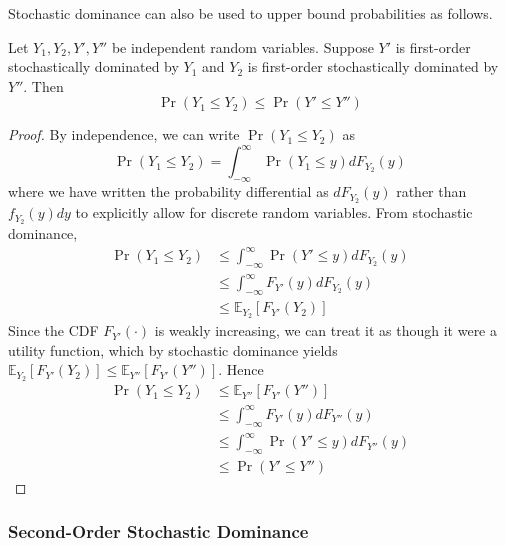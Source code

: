 \documentclass[11pt]{report} %
\begin{document}
Stochastic dominance can also be used to upper bound probabilities as follows.
\begin{corollary}
Let $Y_{1}, Y_{2}, Y', Y''$ be independent random variables. Suppose $Y'$ is first-order stochastically dominated by $Y_{1}$ and $Y_{2}$ is first-order stochastically dominated by $Y''$. Then
\begin{equation}
\operatorname{Pr}\left(Y_{1} \leq Y_{2}\right) \leq \operatorname{Pr}\left(Y' \leq Y''\right)
\end{equation}
\end{corollary}
\begin{proof}
By independence, we can write $\operatorname{Pr}\left(Y_{1} \leq Y_{2}\right)$ as
\begin{equation}
\operatorname{Pr}\left(Y_{1} \leq Y_{2}\right) = \int_{-\infty}^{\infty}\operatorname{Pr}\left(Y_{1} \leq y\right)dF_{Y_{2}}\left(y\right)
\end{equation}
where we have written the probability differential as $dF_{Y_{2}}\left(y\right)$ rather than $f_{Y_{2}}\left(y\right)dy$ to explicitly allow for discrete random variables. From stochastic dominance,
\begin{align}
\operatorname{Pr}\left(Y_{1} \leq Y_{2}\right) &\leq \int_{-\infty}^{\infty}\operatorname{Pr}\left(Y' \leq y\right)dF_{Y_{2}}\left(y\right) \\
&\leq \int_{-\infty}^{\infty}F_{Y'}\left(y\right)dF_{Y_{2}}\left(y\right) \\
&\leq \mathbb{E}_{Y_{2}}\left[F_{Y'}\left(Y_{2}\right)\right]
\end{align}
Since the CDF $F_{Y'}\left(\cdot\right)$ is weakly increasing, we can treat it as though it were a utility function, which by stochastic dominance yields $\mathbb{E}_{Y_{2}}\left[F_{Y'}\left(Y_{2}\right)\right] \leq \mathbb{E}_{Y''}\left[F_{Y'}\left(Y''\right)\right]$. Hence
\begin{align}
\operatorname{Pr}\left(Y_{1} \leq Y_{2}\right) &\leq \mathbb{E}_{Y''}\left[F_{Y'}\left(Y''\right)\right] \\
&\leq \int_{-\infty}^{\infty}F_{Y'}\left(y\right)dF_{Y''}\left(y\right) \\
&\leq \int_{-\infty}^{\infty}\operatorname{Pr}\left(Y' \leq y\right)dF_{Y''}\left(y\right) \\
&\leq \operatorname{Pr}\left(Y' \leq Y''\right)
\end{align}
\end{proof}

\subsubsection{Second-Order Stochastic Dominance}
\end{document}
